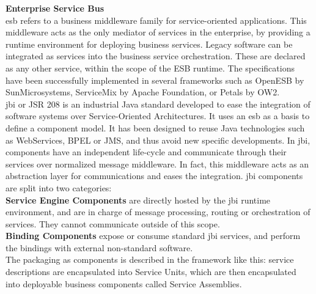 \vspace{0.5cm}

{\bf Enterprise Service Bus}\\

\gls{esb} refers to a business middleware family for service-oriented applications. This middleware acts as the only mediator of services in the enterprise, by providing a runtime environment for deploying business services. Legacy software can be integrated as services into the business service orchestration. These are declared as any other service, within the scope of the ESB runtime. The specifications have been successfully implemented in several frameworks such as OpenESB by SunMicrosystems, ServiceMix by Apache Foundation, or Petals by OW2.\\
\gls{jbi} or JSR 208 is an industrial Java standard developed to ease the integration of software systems over Service-Oriented Architectures. It uses an \gls{esb} as a basis to define a component model. It has been designed to reuse Java technologies such as WebServices, BPEL or JMS, and thus avoid new specific developments.  
In \gls{jbi}, components have an independent life-cycle and communicate through their services over normalized message middleware. In fact, this middleware acts as an abstraction layer for communications and eases the integration. \gls{jbi} components are split into two categories:\\
{\bf Service Engine Components} are directly hosted by the \gls{jbi} runtime environment, and are in charge of message processing, routing or orchestration of services. They cannot communicate outside of this scope.\\
{\bf Binding Components} expose or consume standard \gls{jbi} services, and perform the bindings with external non-standard software.\\
The packaging as components is described in the framework like this: service descriptions are encapsulated into Service Units, which are then encapsulated into deployable business components called Service Assemblies.\\
 
